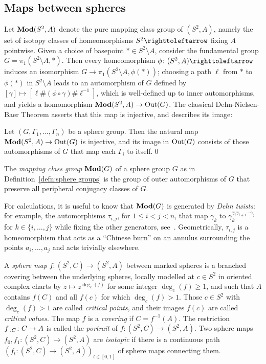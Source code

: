 \documentclass{amsart}
\begin{document}
\subsection{Maps between spheres}\label{ss:maps between spheres}
Let $\mathbf{\relax Mod}(S^2,A)$ denote the pure mapping class group of $(S^2,A)$,
namely the set of isotopy classes of homeomorphisms $S^2\selfmap$
fixing $A$ pointwise. Given a choice of basepoint
$*\in S^2\setminus A$, consider the fundamental group
$G=\pi_1(S^2\setminus A,*)$. Then every homeomorphism
$\phi\colon(S^2,A)\selfmap$ induces an isomorphism
$G\to\pi_1(S^2\setminus A,\phi(*))$; choosing a path $\ell$ from $*$
to $\phi(*)$ in $S^2\setminus A$ leads to an automorphism of $G$
defined by $[\gamma]\mapsto[\ell\#(\phi\circ\gamma)\#\ell^{-1}]$,
which is well-defined up to inner automorphisms, and yields a
homomorphism $\mathbf{\relax Mod}(S^2,A)\to\operatorname{Out}(G)$. The classical Dehn-Nielsen-Baer
Theorem asserts that this map is injective, and describes its image:
\begin{thm}\label{thm:dehn-nielsen-baer}
  Let $(G,\Gamma_1,\dots,\Gamma_n)$ be a sphere group. Then the
  natural map $\mathbf{\relax Mod}(S^2,A)\to\operatorname{Out}(G)$ is injective, and its image in
  $\operatorname{Out}(G)$ consists of those automorphisms of $G$ that map each
  $\Gamma_i$ to itself.\qed
\end{thm}

\begin{defn}
  The \emph{mapping class group} $\mathbf{\relax Mod}(G)$ of a sphere group $G$ as in
  Definition~\ref{defn:sphere groups} is the group of outer
  automorphisms of $G$ that preserve all peripheral conjugacy classes
  of $G$.
\end{defn}
For calculations, it is useful to know that $\mathbf{\relax Mod}(G)$ is generated by
\emph{Dehn twists}: for example, the automorphisms $\tau_{i,j}$, for
$1\le i<j<n$, that map $\gamma_k$ to
$\gamma_k^{\gamma_i\gamma_{i+1}\cdots\gamma_j}$ for
$k\in\{i,\dots,j\}$ while fixing the other generators,
see~\cite{margalit+mccammond:braid}. Geometrically, $\tau_{i,j}$ is a
homeomorphism that acts as a ``Chinese burn'' on an annulus
surrounding the points $a_i,\dots,a_j$ and acts trivially elsewhere.

A \emph{sphere map} $f\colon(S^2,C)\to(S^2,A)$ between marked spheres
is a branched covering between the underlying spheres, locally
modelled at $c\in S^2$ in oriented complex charts by
$z\mapsto z^{\deg_c(f)}$ for some integer $\deg_c(f)\ge1$, and such
that $A$ contains $f(C)$ and all $f(c)$ for which $\deg_c(f)>1$. Those
$c\in S^2$ with $\deg_c(f)>1$ are called \emph{critical points}, and
their images $f(c)$ are called \emph{critical values}. The map $f$ is
a \emph{covering} if $C=f^{-1}(A)$. The restriction
$f\!\downharpoonleft_{\!C}\colon C\to A$ is called the \emph{portrait} of
$f\colon(S^2,C)\to(S^2,A)$. Two sphere maps
$f_0,f_1\colon (S^2,C)\to (S^2,A)$ are \emph{isotopic} if there is a
continuous path $(f_t\colon (S^2,C)\to (S^2,A))_{t\in[0,1]}$ of sphere
maps connecting them.
\end{document}
